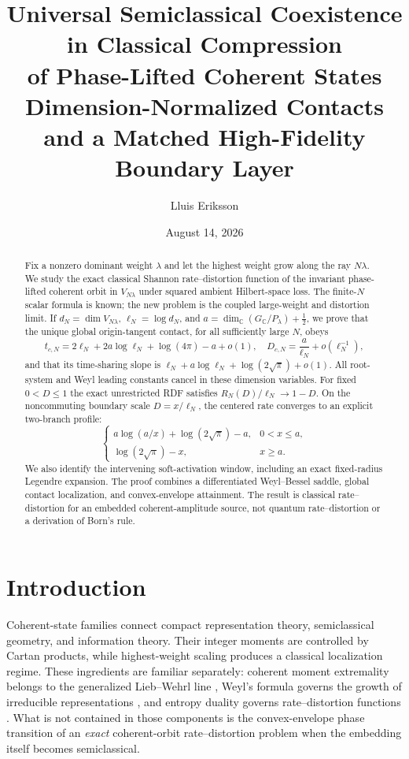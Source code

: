 \documentclass[11pt]{article}
\title{\bfseries Universal Semiclassical Coexistence in Classical Compression\\[3pt]
of Phase-Lifted Coherent States\\[6pt]
\large Dimension-Normalized Contacts and a Matched High-Fidelity Boundary Layer}
\author{Lluis Eriksson}
\date{August 14, 2026}
\newcommand{\C}{\mathbb C}
\begin{document}
\maketitle

\begin{abstract}
Fix a nonzero dominant weight $\lambda$ and let the highest weight grow along
the ray $N\lambda$.  We study the exact classical Shannon rate--distortion
function of the invariant phase-lifted coherent orbit in $V_{N\lambda}$ under
squared ambient Hilbert-space loss.  The finite-$N$ scalar formula is known;
the new problem is the coupled large-weight and distortion limit.  If
$d_N=\dim V_{N\lambda}$, $\ell_N=\log d_N$, and
$a=\dim_{\C}(G_{\C}/P_\lambda)+\tfrac12$, we prove that the unique global
origin-tangent contact, for all sufficiently large $N$, obeys
\[
 t_{c,N}=2\ell_N+2a\log\ell_N+\log(4\pi)-a+o(1),
 \quad D_{c,N}=\frac{a}{\ell_N}+o(\ell_N^{-1}),
\]
and that its time-sharing slope is
$\ell_N+a\log\ell_N+\log(2\sqrt\pi)+o(1)$.
All root-system and Weyl leading constants cancel in these dimension
variables.  For fixed $0<D\le1$ the exact unrestricted RDF satisfies
$R_N(D)/\ell_N\to1-D$.  On the noncommuting boundary scale
$D=x/\ell_N$, the centered rate converges to an explicit two-branch profile:
\[
 \begin{cases}
 a\log(a/x)+\log(2\sqrt\pi)-a,&0<x\le a,\\
 \log(2\sqrt\pi)-x,&x\ge a.
 \end{cases}
\]
We also identify the intervening soft-activation window, including an exact
fixed-radius Legendre expansion.  The proof combines a differentiated
Weyl--Bessel saddle, global contact localization, and convex-envelope
attainment.  The result is classical rate--distortion for an embedded
coherent-amplitude source, not quantum rate--distortion or a derivation of
Born's rule.
\end{abstract}

\section{Introduction}

Coherent-state families connect compact representation theory, semiclassical
geometry, and information theory.  Their integer moments are controlled by
Cartan products, while highest-weight scaling produces a classical
localization regime.  These ingredients are familiar separately: coherent
moment extremality belongs to the generalized Lieb--Wehrl line
\cite{Lieb1978,Sugita2002,LiebSolovej2016}, Weyl's formula governs the growth
of irreducible representations \cite{FultonHarris1991}, and entropy duality
governs rate--distortion functions \cite{Csiszar1974,CoverThomas2006}.
What is not contained in those components is the convex-envelope phase
transition of an \emph{exact} coherent-orbit rate--distortion problem when
the embedding itself becomes semiclassical.
\end{document}

